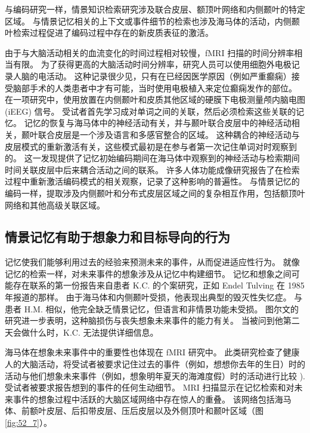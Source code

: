 与编码研究一样，情景知识检索研究涉及联合皮层、额顶叶网络和内侧颞叶的特定区域。 与情景记忆相关的上下文或事件细节的检索也涉及海马体的活动，内侧颞叶检索过程促进了编码过程中存在的新皮质表征的激活。

由于与大脑活动相关的血流变化的时间过程相对较慢，fMRI 扫描的时间分辨率相当有限。 为了获得更高的大脑活动时间分辨率，研究人员可以使用细胞外电极记录人脑的电活动。 这种记录很少见，只有在已经因医学原因（例如严重癫痫）接受脑部手术的人类患者中才有可能，当时使用电极植入来定位癫痫发作的部位。 在一项研究中，使用放置在内侧颞叶和皮质其他区域的硬膜下电极测量颅内脑电图 (iEEG) 信号。 受试者首先学习成对单词之间的关联，然后必须检索这些关联的记忆。 记忆的恢复与海马体中的神经活动有关，并与颞叶联合皮层中的神经活动相关，颞叶联合皮层是一个涉及语言和多感官整合的区域。 这种耦合的神经活动与皮层模式的重新激活有关，这些模式最初是在参与者第一次记住单词对时观察到的。 这一发现提供了记忆初始编码期间在海马体中观察到的神经活动与检索期间时间关联皮层中后来耦合活动之间的联系。 许多人体功能成像研究报告了在检索过程中重新激活编码模式的相关观察，记录了这种影响的普遍性。 与情景记忆的编码一样，提取涉及内侧颞叶和分布式皮层区域之间的复杂相互作用，包括额顶叶网络和其他高级关联区域。

\subsection{情景记忆有助于想象力和目标导向的行为}
记忆使我们能够利用过去的经验来预测未来的事件，从而促进适应性行为。 就像记忆的检索一样，对未来事件的想象涉及从记忆中构建细节。 记忆和想象之间可能存在联系的第一份报告来自患者 K.C. 的个案研究，正如 Endel Tulving 在 1985 年报道的那样。 由于海马体和内侧颞叶受损，他表现出典型的毁灭性失忆症。 与患者 H.M. 相似，他完全缺乏情景记忆，但语言和非情景功能未受损。 图尔文的研究进一步表明，这种脑损伤与丧失想象未来事件的能力有关。 当被问到他第二天会做什么时，K.C. 无法提供详细信息。

海马体在想象未来事件中的重要性也体现在 fMRI 研究中。 此类研究检查了健康人的大脑活动，将受试者被要求记住过去的事件（例如，想想你去年的生日）时的活动与他们想象未来事件（例如，想象明年夏天的海滩度假）时的活动进行比较 ). 受试者被要求报告想到的事件的任何生动细节。 MRI 扫描显示在记忆检索和对未来事件的想象过程中活跃的大脑区域网络中存在惊人的重叠。 该网络包括海马体、前额叶皮层、后扣带皮层、压后皮层以及外侧顶叶和颞叶区域（图 \ref{fig:52_7}）。

